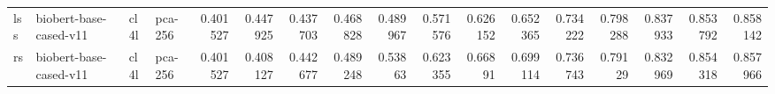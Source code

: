\begin{tabular}{llllrrrrrrrrrrrrr}
 lss         & biobert-base-cased-v11 & cl4l             & pca-256               &     0.401527 &     0.447925 &     0.437703 &     0.468828 &     0.489967 &     0.571576 &     0.626152 &     0.652365 &     0.734222 &     0.798288 &      0.837933 &      0.853792 &      0.858142 \\
 rs          & biobert-base-cased-v11 & cl4l             & pca-256               &     0.401527 &     0.408127 &     0.442677 &     0.489248 &     0.53863  &     0.623355 &     0.66891  &     0.699114 &     0.736743 &     0.79129  &      0.832969 &      0.854318 &      0.857966 \\
\hline
\end{tabular}